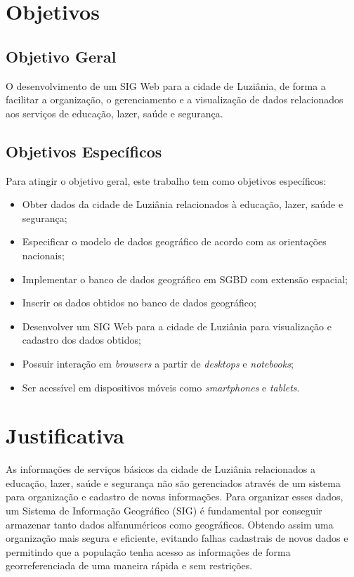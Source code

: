\section{Objetivos}

\subsection{Objetivo Geral}

O desenvolvimento de um SIG Web para a cidade de Luziânia, de forma a facilitar a organização, o gerenciamento e a visualização de dados relacionados aos serviços de educação, lazer, saúde e segurança.

\newpage

\subsection{Objetivos Específicos}

Para atingir o objetivo geral, este trabalho tem como objetivos específicos:

\begin{itemize}
\item Obter dados da cidade de Luziânia relacionados à educação, lazer, saúde e segurança;
\item Especificar o modelo de dados geográfico de acordo com as orientações nacionais;
\item Implementar o banco de dados geográfico em SGBD com extensão espacial;
\item Inserir os dados obtidos no banco de dados geográfico;
\item Desenvolver um SIG Web para a cidade de Luziânia para visualização e cadastro dos dados obtidos;
\item Possuir interação em \textit{browsers} a partir de \textit{desktops} e \textit{notebooks};
\item Ser acessível em dispositivos móveis como \textit{smartphones} e \textit{tablets}.
\end{itemize}

\section{Justificativa}

As informações de serviços básicos da cidade de Luziânia relacionados a educação, lazer, saúde e segurança não são gerenciados através de um sistema para organização e cadastro de novas informações.
Para organizar esses dados, um Sistema de Informação Geográfico (SIG) é fundamental por conseguir armazenar tanto dados alfanuméricos como geográficos. Obtendo assim uma organização mais segura e eficiente, evitando falhas cadastrais de novos dados e permitindo que a população tenha acesso as informações de forma georreferenciada de uma maneira rápida e sem restrições.

